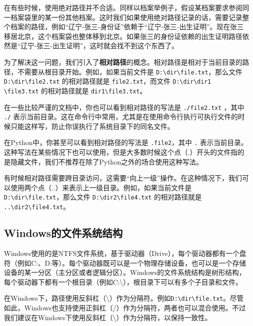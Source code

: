 \documentclass[../main.tex]{subfiles}
\begin{document}
在有些时候，使用绝对路径并不合适。同样以档案举例子，假设某档案要求参阅同一档案袋里的某一份其他档案。这时我们如果使用绝对路径记录的话，需要记录整个档案的路径，例如“辽宁-张三-身份证”依赖于“辽宁-张三-出生证明”。现在张三移居北京，这个档案袋也整体移到北京。如果张三的身份证依赖的出生证明路径依然是“辽宁-张三-出生证明”，这时就会找不到这个东西了。

为了解决这一问题，我们引入了\textbf{相对路径}的概念。相对路径是相对于当前目录的路径，不需要从根目录开始。例如，如果当前文件是 \texttt{D:\textbackslash dir\textbackslash file.txt}，那么文件 \texttt{D:\textbackslash dir\textbackslash file2.txt} 的相对路径就是 \texttt{file2.txt}，而文件 \texttt{D:\textbackslash dir\textbackslash dir1 \textbackslash file3.txt} 的相对路径就是 \texttt{dir1\textbackslash file3.txt}。

在一些比较严谨的文档中，你也可以看到相对路径的写法是 \texttt{./file2.txt} ，其中 \texttt{./} 表示当前目录。这在命令行中常用，尤其是在使用命令行执行可执行文件的时候只能这样写，防止你误执行了系统目录下的同名文件。

在Python中，你甚至可以看到相对路径的写法是 \texttt{.file2}，其中 \texttt{.} 表示当前目录。这种写法在某些情况下也可以使用，但是大多数时候这个点（.）开头的文件指的是隐藏文件，我们不推荐在除了Python之外的场合使用这种写法。

有时候相对路径需要跨目录访问，这需要“向上一级”操作。在这种情况下，我们可以使用两个点（..）来表示上一级目录。例如，如果当前文件是 \texttt{D:\textbackslash dir\textbackslash file.txt}，那么文件 \texttt{D:\textbackslash dir2\textbackslash file4.txt} 的相对路径就是 \texttt{..\textbackslash dir2\textbackslash file4.txt}。

\subsection{Windows的文件系统结构}

Windows使用的是NTFS文件系统，基于驱动器（Drive），每个驱动器都有一个盘符（例如C:、D:等）。每个驱动器既可以是一个物理存储设备，也可以是一个存储设备的某一分区（主分区或者逻辑分区）。Windows的文件系统结构是树形结构，每个驱动器下都有一个根目录（例如C:\textbackslash），根目录下可以有多个子目录和文件。

在Windows下，路径使用反斜杠（\textbackslash）作为分隔符。例如\texttt{D:\textbackslash dir\textbackslash file.txt}。尽管如此，Windows也支持使用正斜杠（/）作为分隔符，两者也可以混合使用。不过我们建议在Windows下使用反斜杠（\textbackslash）作为分隔符，以保持一致性。
\end{document}
